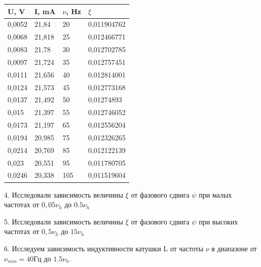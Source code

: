 \documentclass[a4paper, 12pt]{article} %
\begin{document}
	\centering
	    \begin{table}[!ht]
            \centering
            \begin{tabular}{|l|l|l|l|}
             \hline
            U, V & I, mA & $\nu$, Hz & $\xi$ \\ \hline
            0,0052 & 21,84 & 20 & 0,011904762 \\ \hline
            0,0068 & 21,818 & 25 & 0,012466771 \\ \hline
            0,0083 & 21,78 & 30 & 0,012702785 \\ \hline
            0,0097 & 21,724 & 35 & 0,012757451 \\ \hline
            0,0111 & 21,656 & 40 & 0,012814001 \\ \hline
            0,0124 & 21,573 & 45 & 0,012773168 \\ \hline
            0,0137 & 21,492 & 50 & 0,01274893 \\ \hline
            0,015 & 21,397 & 55 & 0,012746052 \\ \hline
            0,0173 & 21,197 & 65 & 0,012556204 \\ \hline
            0,0194 & 20,985 & 75 & 0,012326265 \\ \hline
            0,0214 & 20,769 & 85 & 0,012122139 \\ \hline
            0,023 & 20,551 & 95 & 0,011780705 \\ \hline
            0,0246 & 20,338 & 105 & 0,011519604 \\ \hline
            \end{tabular}
    \end{table}

\medskip	

	4. Исследовали зависимость величины $\xi$ от фазового сдвига $\psi$ при малых частотах от $0,05\nu_h$ до $0.5\nu_h$
	
	
	5. Исследовали зависимость величины $\xi$ от фазового сдвига $\psi$ при высоких частотах от $0,5\nu_h$ до $15\nu_h$
	
	6. Исследуем зависимость индуктивности катушки L от частоты $\nu$ в диапазоне от $\nu_{min} = 40 Гц$ до $1.5\nu_h$.
	
\end{document}
